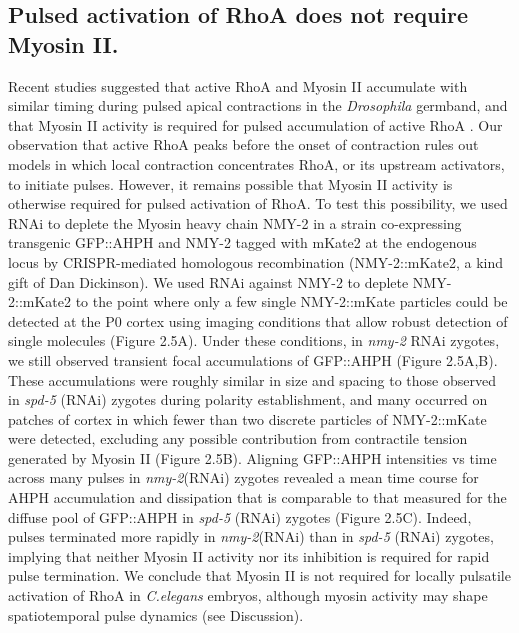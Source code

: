 \documentclass{ucetd}
\begin{document}
\subsection{Pulsed activation of RhoA does not require Myosin II.}
Recent studies suggested that active RhoA and Myosin II accumulate with similar timing during pulsed apical contractions in the \textit{Drosophila} germband, and that Myosin II activity is required for pulsed accumulation of active RhoA \cite{Munjal:2015bx}. Our observation that active RhoA peaks before the onset of contraction rules out models in which local contraction concentrates RhoA, or its upstream activators, to initiate pulses. However, it remains possible that Myosin II activity is otherwise required for pulsed activation of RhoA. To test this possibility, we used RNAi to deplete the Myosin heavy chain NMY-2 in a strain co-expressing transgenic GFP::AHPH and NMY-2 tagged with mKate2 at the endogenous locus by CRISPR-mediated homologous recombination (NMY-2::mKate2, a kind gift of Dan Dickinson).  We used RNAi against NMY-2 to deplete NMY-2::mKate2 to the point where only a few single NMY-2::mKate particles could be detected at the P0 cortex using imaging conditions that allow robust detection of single molecules (Figure 2.5A). Under these conditions, in \textit{nmy-2} RNAi zygotes, we still observed transient focal accumulations of GFP::AHPH (Figure 2.5A,B).  These accumulations were roughly similar in size and spacing to those observed in \textit{spd-5} (RNAi) zygotes during polarity establishment, and many occurred on patches of cortex in which fewer than two discrete particles of NMY-2::mKate were detected, excluding any possible contribution from contractile tension generated by Myosin II (Figure 2.5B). Aligning GFP::AHPH intensities vs time across many pulses in \textit{nmy-2}(RNAi) zygotes revealed a mean time course for AHPH accumulation and dissipation that is comparable to that measured for the diffuse pool of GFP::AHPH in \textit{spd-5} (RNAi) zygotes (Figure 2.5C).  Indeed, pulses terminated more rapidly in \textit{nmy-2}(RNAi) than in \textit{spd-5} (RNAi) zygotes, implying that neither Myosin II activity nor its inhibition is required for rapid pulse termination. We conclude that Myosin II is not required for locally pulsatile activation of RhoA in \textit{C.elegans} embryos, although myosin activity may shape spatiotemporal pulse dynamics (see Discussion).
\end{document}

